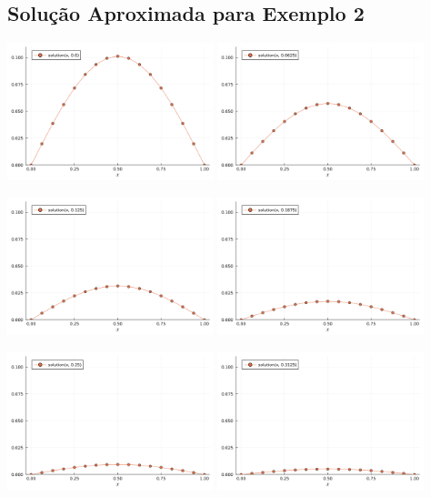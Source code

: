 \documentclass[a4paper]{article}
\begin{document}
\newpage
\subsection{Solução Aproximada para Exemplo 2}

\includegraphics[width=0.45\textwidth]{images/result-00}
\includegraphics[width=0.45\textwidth]{images/result-01}

\includegraphics[width=0.45\textwidth]{images/result-02}
\includegraphics[width=0.45\textwidth]{images/result-03}

\includegraphics[width=0.45\textwidth]{images/result-04}
\includegraphics[width=0.45\textwidth]{images/result-05}
\end{document}
